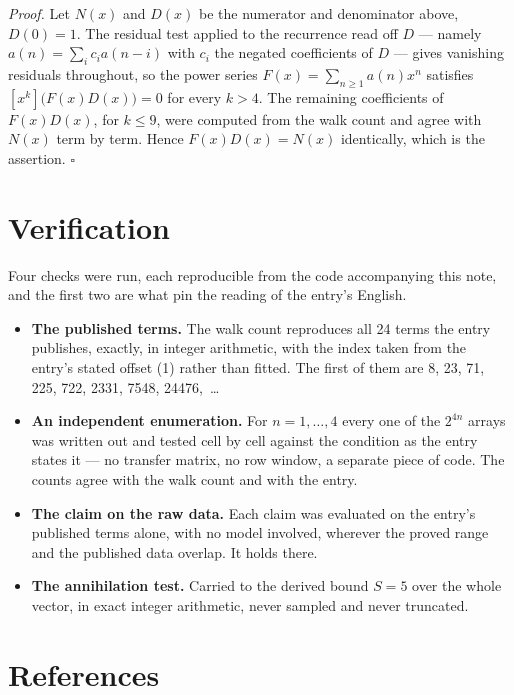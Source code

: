 \documentclass[11pt]{article}
\theoremstyle{definition}
\begin{document}
{\itshape Proof.} Let $N(x)$ and $D(x)$ be the numerator and denominator above, $D(0)=1$. The residual test applied to the recurrence read off $D$ --- namely $a(n) = \sum_i c_i a(n-i)$ with $c_i$ the negated coefficients of $D$ --- gives vanishing residuals throughout, so the power series $F(x)=\sum_{n\ge 1}a(n)x^n$ satisfies $[x^k]\bigl(F(x)D(x)\bigr) = 0$ for every $k > 4$. The remaining coefficients of $F(x)D(x)$, for $k \le 9$, were computed from the walk count and agree with $N(x)$ term by term. Hence $F(x)D(x) = N(x)$ identically, which is the assertion. $\square$

\section{Verification}

Four checks were run, each reproducible from the code accompanying this note, and the first two are what pin the reading of the entry's English.

\begin{itemize}

\item {\bfseries The published terms.} The walk count reproduces all 24 terms the entry publishes, exactly, in integer arithmetic, with the index taken from the entry's stated offset (1) rather than fitted. The first of them are 8, 23, 71, 225, 722, 2331, 7548, 24476,~\dots

\item {\bfseries An independent enumeration.} For $n = 1,\dots,4$ every one of the $2^{4n}$ arrays was written out and tested cell by cell against the condition as the entry states it --- no transfer matrix, no row window, a separate piece of code. The counts agree with the walk count and with the entry.

\item {\bfseries The claim on the raw data.} Each claim was evaluated on the entry's published terms alone, with no model involved, wherever the proved range and the published data overlap. It holds there.

\item {\bfseries The annihilation test.} Carried to the derived bound $S = 5$ over the whole vector, in exact integer arithmetic, never sampled and never truncated.

\end{itemize}

\section{References}
\end{document}
